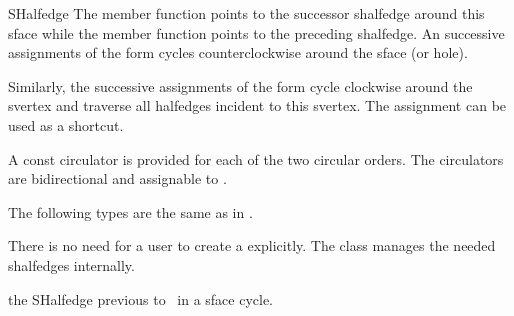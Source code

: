\begin{ccRefClass}{SHalfedge}
The  member function points 
to the successor shalfedge around this sface while the  member 
function points to the preceding shalfedge.  An
successive assignments of the form  cycles
counterclockwise around the sface (or hole).

Similarly, the successive
assignments of the form  cycle
clockwise around the svertex and traverse all halfedges incident to
this svertex. The assignment  can be 
used as a shortcut.

A const circulator is provided for each of the two circular orders.
The circulators are bidirectional and assignable to .


\ccTypes
{}
\ccThreeToTwo

The following types are the same as in .



\ccGlue
{}
\ccGlue
{}

\ccCreation
{}

There is no need for a user to create a  explicitly. The
class  manages the needed shalfedges internally.


\ccOperations






{the SHalfedge previous to \ccVar\ in a sface cycle.}


\end{ccRefClass}
